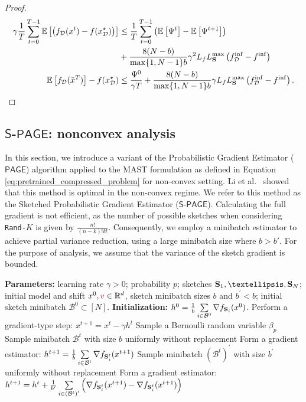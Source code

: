 \documentclass{article}
\newcommand{\rnd}[1]{{\texttt{Rand-}}#1}
\newcommand{\shift}{{\color{purple}s}}
\newcommand{\bb}{\mathbb}
\newcommand{\R}{\bb R}
\newcommand{\cD}{\mathcal{D}}
\newcommand{\Exp}[1]{{\bb E}\left[#1\right]}
\theoremstyle{plain}
\newcommand{\tf}{f_{\mathcal{D}}}
\renewcommand{\shift}{{\color{purple}v}}
\newcommand{\mS}{{\bf S}}
\theoremstyle{plain}
\theoremstyle{definition}
\theoremstyle{remark}
\begin{document}
\begin{proof}
\begin{equation*}
\begin{split}
        \gamma\frac{1}{T}\sum^{T-1}_{t=0}\Exp{\left(\tf(x^t) - f(x_\cD^\star)\right)} &\leq \frac{1}{T}\sum^{T-1}_{t=0}\left( \Exp{\Psi^t} - \Exp{\Psi^{t+1}}\right)\\&+ \frac{8(N-b)}{\max\{1,N-1\}b} \gamma^2 L_fL_{\mS}^{\max}\left(\tf^{\inf} - f^{\inf}\right)\\
        \Exp{\tf(\bar{x}^T)} - f(x_\cD^\star) &\leq \frac{\Psi^0}{\gamma T} + \frac{8(N-b)}{\max\{1,N-1\}b} \gamma L_fL_{\mS}^{\max}\left(\tf^{\inf} - f^{\inf}\right).
		\end{split}
	\end{equation*}
\end{proof}

\clearpage
\subsection{$\mathsf{S}$-$\mathsf{PAGE}$: nonconvex analysis}
In this section, we introduce a variant of the Probabilistic Gradient Estimator ($\mathsf{PAGE}$) algorithm applied to the MAST formulation as defined in Equation \ref{eq:pretrained_compressed_problem} for non-convex setting. Li et al.~\citep{PAGE2021} showed that this method is optimal in the non-convex regime. We refer to this method as the Sketched Probabilistic Gradient Estimator ($\mathsf{S}$-$\mathsf{PAGE}$). Calculating the full gradient is not efficient, as the number of possible sketches when considering \rnd{$K$} is given by $\frac{n!}{(n-k)!k!}$. Consequently, we employ a minibatch estimator to achieve partial variance reduction, using a large minibatch size where $b > b'$. For the purpose of analysis, we assume that the variance of the sketch gradient is bounded.
\begin{algorithm}[t]
\begin{algorithmic}[1]
\caption{Sketched ProbAbilistic Gradient Estimator ($\mathsf{S}$-$\mathsf{PAGE}$)} \label{alg:S-PAGE}
    \STATE \textbf{Parameters:} learning rate $\gamma > 0$; probability $p$; sketches $\mS_1, \ldots, \mS_{N}$; initial model and shift $x^0, \shift \in \R^d$, sketch minibatch sizes $b$ and $b^\prime < b $; initial sketch minibatch $\mathcal{B}^0 \subset [N]$.
    \STATE \textbf{Initialization: }  $h^0 = \frac{1}{b}\sum \limits_{i \in \mathcal{B}^0}\nabla f_{\mS_i}(x^0)$.
    \STATE  Perform a gradient-type step:
    $x^{t+1}=x^t-\gamma h^t$
    \STATE Sample a Bernoulli random variable $\beta_p$
        \STATE Sample minibatch $\mathcal{B}^{t}$ with size $b$ uniformly without replacement
        \STATE Form a gradient estimator:
       $h^{t+1} = \frac{1}{b}\sum \limits_{i \in \mathcal{B}^{t}}\nabla f_{\mS^t_i}(x^{t+1}) $
    \ELSE
    \STATE Sample minibatch $\left(\mathcal{B}^{t}\right)^\prime$ with size $b^\prime$ uniformly without replacement
    \STATE Form a gradient estimator:
        $h^{t+1} = h^t+\frac{1}{b^{\prime}} \sum \limits_{i \in \left(\mathcal{B}^{t}\right)^\prime}\left( \nabla f_{\mS^t_i}(x^{t+1})-\nabla f_{\mS^t_i}(x^{t+1})\right)$
    \ENDIF
    \ENDFOR
\end{algorithmic}
\end{algorithm}
\end{document}
